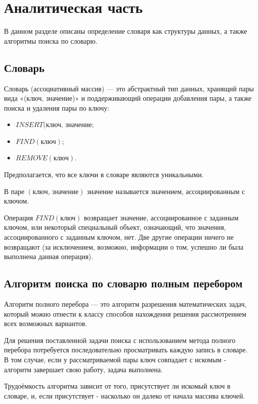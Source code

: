 \documentclass[12pt]{report}
\begin{document}
\chapter{Аналитическая часть}
В данном разделе описаны определение словаря как структуры данных, а также алгоритмы поиска по словарю.

\section{Словарь}
Словарь (ассоциативный массив)\cite{NIST} — это абстрактный тип данных, хранящий пары вида «(ключ, значение)» и поддерживающий операции добавления пары, а также поиска и удаления пары по ключу:
\begin{itemize}
\item $INSERT(\textit{ключ, значение}$;
\item $FIND(\textit{ключ})$;
\item $REMOVE(\textit{ключ})$.
\end{itemize}

Предполагается, что все ключи в словаре являются уникальными.

В паре $(\textit{ключ, значение})$ $\textit{значение}$ называется значением, ассоциированным с ключом.

Операция $FIND(\textit{ключ})$ возвращает значение, ассоциированное с заданным ключом, или некоторый специальный объект, означающий, что значения, ассоциированного с заданным ключом, нет. Две другие операции ничего не возвращают (за исключением, возможно, информации о том, успешно ли была выполнена данная операция).

\section{Алгоритм поиска по словарю полным перебором}
Алгоритм полного перебора \cite{AI} — это алгоритм разрешения математических задач, который можно отнести к классу способов нахождения решения рассмотрением всех возможных вариантов.

Для решения поставленной задачи поиска с использованием метода полного перебора потребуется последовательно просматривать каждую запись в словаре. В том случае, если у рассматриваемой пары ключ совпадает с искомым - алгоритм завершает свою работу, задача выполнена.

Трудоёмкость алгоритма зависит от того, присутствует ли искомый ключ в словаре, и, если присутствует - насколько он далеко от начала массива ключей.
\end{document}
